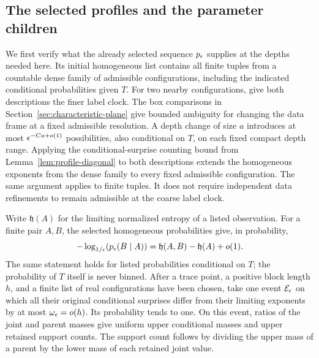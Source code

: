 \subsection{The selected profiles and the parameter children}

We first verify what the already selected sequence $p_\epsilon$ supplies
at the depths needed here.  Its initial homogeneous list contains all
finite tuples from a countable dense family of admissible configurations,
including the indicated conditional probabilities given $T$.
For two nearby configurations, give both descriptions the finer label
clock.  The box comparisons in Section~\ref{sec:characteristic-plane}
give bounded ambiguity for changing the data frame at a fixed admissible
resolution.  A depth change of size $a$ introduces at most
$\epsilon^{-Ca+o(1)}$ possibilities, also conditional on $T$, on each fixed
compact depth range.  Applying the conditional-surprise counting bound
from Lemma~\ref{lem:profile-diagonal} to both descriptions extends the
homogeneous exponents from the dense family to every fixed admissible
configuration.  The same argument applies to finite tuples.  It does
not require independent data refinements to remain admissible at the
coarse label clock.

Write $\mathfrak h(A)$ for the limiting normalized entropy of a listed
observation.  For a finite pair $A,B$, the selected homogeneous
probabilities give, in probability,
\begin{equation}
 -\log_{1/\epsilon}\!\left(p_\epsilon(B\mid A)\right)
 =\mathfrak h(A,B)-\mathfrak h(A)+o(1).
 \label{eq:rate-ratio}
\end{equation}
The same statement holds for listed probabilities conditional on $T$;
the probability of $T$ itself is never binned.  After a trace point,
a positive block length $h$, and a finite list of real configurations
have been chosen, take one event $\mathcal E_\epsilon$ on which all their original
conditional surprises differ from their limiting exponents by at most
$\omega_\epsilon=o(h)$.  Its probability tends to one.  On this event,
ratios of the joint and parent masses give uniform upper conditional
masses and upper retained support counts.  The support count follows
by dividing the upper mass of a parent by the lower mass of each
retained joint value.

